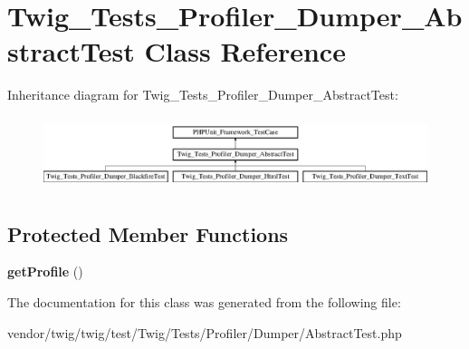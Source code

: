 \hypertarget{classTwig__Tests__Profiler__Dumper__AbstractTest}{}\section{Twig\+\_\+\+Tests\+\_\+\+Profiler\+\_\+\+Dumper\+\_\+\+Abstract\+Test Class Reference}
\label{classTwig__Tests__Profiler__Dumper__AbstractTest}
Inheritance diagram for Twig\+\_\+\+Tests\+\_\+\+Profiler\+\_\+\+Dumper\+\_\+\+Abstract\+Test\+:\begin{figure}[H]
\begin{center}
\leavevmode
\includegraphics[height=2.137405cm]{classTwig__Tests__Profiler__Dumper__AbstractTest}
\end{center}
\end{figure}
\subsection*{Protected Member Functions}
\begin{DoxyCompactItemize}
\item 
{\bfseries get\+Profile} ()\hypertarget{classTwig__Tests__Profiler__Dumper__AbstractTest_ae02d3ff1360ec30651830a28b8efe0b8}{}\label{classTwig__Tests__Profiler__Dumper__AbstractTest_ae02d3ff1360ec30651830a28b8efe0b8}

\end{DoxyCompactItemize}


The documentation for this class was generated from the following file\+:\begin{DoxyCompactItemize}
\item 
vendor/twig/twig/test/\+Twig/\+Tests/\+Profiler/\+Dumper/Abstract\+Test.\+php\end{DoxyCompactItemize}
